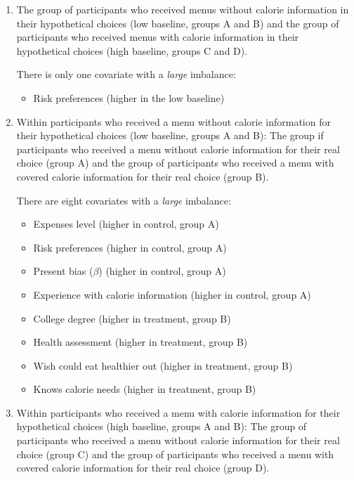 \begin{enumerate}
  \item The group of participants who received menus without calorie information in their hypothetical choices (low baseline, groups A and B) and the group of participants who received menus with calorie information in their hypothetical choices (high baseline, groups C and D).

  There is only one covariate with a \emph{large} imbalance:
  \begin{itemize}
    \item Risk preferences (higher in the low baseline)
  \end{itemize}

  \item Within participants who received a menu without calorie information for their hypothetical choices (low baseline, groups A and B): The group if participants who received a menu without calorie information for their real choice (group A) and the group of participants who received a menu with covered calorie information for their real choice (group B).

  There are eight covariates with a \emph{large} imbalance:
  \begin{itemize}
    \item Expenses level (higher in control, group A)
    \item Risk preferences (higher in control, group A)
    \item Present bias ($\beta$) (higher in control, group A)
    \item Experience with calorie information (higher in control, group A)
    \item College degree (higher in treatment, group B)
    \item Health assessment (higher in treatment, group B)
    \item Wish could eat healthier out (higher in treatment, group B)
    \item Knows calorie needs (higher in treatment, group B)
  \end{itemize}

  \item Within participants who received a menu with calorie information for their hypothetical choices (high baseline, groups A and B): The group of participants who received a menu without calorie information for their real choice (group C) and the group of participants who received a menu with covered calorie information for their real choice (group D).


\end{enumerate}
